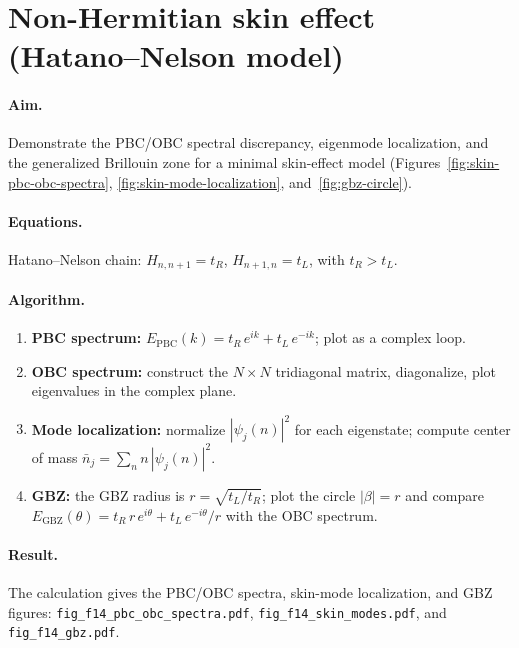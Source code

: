 \section{Non-Hermitian skin effect (Hatano--Nelson model)}
\label{sec:recipe-skin}

\paragraph{Aim.}
Demonstrate the PBC/OBC spectral discrepancy, eigenmode localization,
and the generalized Brillouin zone for a minimal skin-effect model
(Figures~\ref{fig:skin-pbc-obc-spectra},
\ref{fig:skin-mode-localization}, and~\ref{fig:gbz-circle}).

\paragraph{Equations.}
Hatano--Nelson chain: $H_{n,n+1} = t_R$, $H_{n+1,n} = t_L$, with
$t_R > t_L$.

\paragraph{Algorithm.}
\begin{enumerate}
 \item \textbf{PBC spectrum:} $E_{\mathrm{PBC}}(k)
 = t_R\,e^{ik} + t_L\,e^{-ik}$; plot as a complex loop.
 \item \textbf{OBC spectrum:} construct the $N\times N$ tridiagonal
 matrix, diagonalize, plot eigenvalues in the complex plane.
 \item \textbf{Mode localization:} normalize $|\psi_j(n)|^2$ for each
 eigenstate; compute center of mass
 $\bar{n}_j = \sum_n n\,|\psi_j(n)|^2$.
 \item \textbf{GBZ:} the GBZ radius is
 $r = \sqrt{t_L/t_R}$; plot the circle $|\beta| = r$ and compare
 $E_{\mathrm{GBZ}}(\theta) = t_R\,r\,e^{i\theta}
 + t_L\,e^{-i\theta}/r$ with the OBC spectrum.
\end{enumerate}

\paragraph{Result.}
The calculation gives the PBC/OBC spectra, skin-mode localization, and
GBZ figures: \texttt{fig\_f14\_pbc\_obc\_spectra.pdf},
\texttt{fig\_f14\_skin\_modes.pdf}, and \texttt{fig\_f14\_gbz.pdf}.


